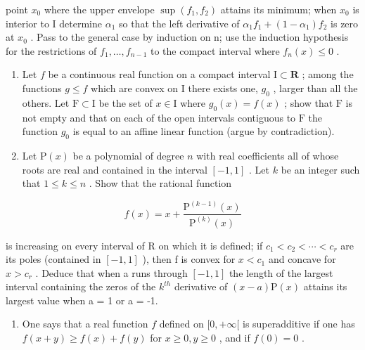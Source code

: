 point \(x_{0}\) where the upper envelope \(\sup(f_{1}, f_{2})\) attains its minimum; when \(x_{0}\) is interior to I determine \(\alpha_{1}\) so that the left derivative of \(\alpha_{1}f_{1} + (1 - \alpha_{1})f_{2}\) is zero at \(x_{0}\) . Pass to the general case by induction on n; use the induction hypothesis for the restrictions of \(f_{1}, \ldots, f_{n-1}\) to the compact interval where \(f_{n}(x) \leqslant 0\) .

\begin{enumerate}
\def\labelenumi{\arabic{enumi})}
\setcounter{enumi}{22}
\item
  Let \(f\) be a continuous real function on a compact interval \(\mathrm{I} \subset \mathbf{R}\) ; among the functions \(g \leqslant f\) which are convex on \(\mathrm{I}\) there exists one, \(g_0\) , larger than all the others. Let \(\mathrm{F} \subset \mathrm{I}\) be the set of \(x \in \mathrm{I}\) where \(g_0(x) = f(x)\) ; show that \(\mathrm{F}\) is not empty and that on each of the open intervals contiguous to \(\mathrm{F}\) the function \(g_0\) is equal to an affine linear function (argue by contradiction).
\item
  Let \(\mathrm{P}(x)\) be a polynomial of degree \(n\) with real coefficients all of whose roots are real and contained in the interval \([-1, 1]\) . Let \(k\) be an integer such that \(1 \leqslant k \leqslant n\) . Show that the rational function
\end{enumerate}

\[
f (x) = x + \frac {\mathrm{P} ^ {(k - 1)} (x)}{\mathrm{P} ^ {(k)} (x)}
\]

is increasing on every interval of R on which it is defined; if \(c_{1} < c_{2} < \cdots < c_{r}\) are its poles (contained in \([-1, 1]\) ), then f is convex for \(x < c_{1}\) and concave for \(x > c_{r}\) . Deduce that when a runs through \([-1, 1]\) the length of the largest interval containing the zeros of the \(k^{th}\) derivative of \((x - a)\mathrm{P}(x)\) attains its largest value when a = 1 or a = -1.

\begin{enumerate}
\def\labelenumi{\arabic{enumi})}
\setcounter{enumi}{24}
\tightlist
\item
  One says that a real function \(f\) defined on \([0, +\infty[\) is superadditive if one has \(f(x + y) \geqslant f(x) + f(y)\) for \(x \geqslant 0, y \geqslant 0\) , and if \(f(0) = 0\) .
\end{enumerate}

